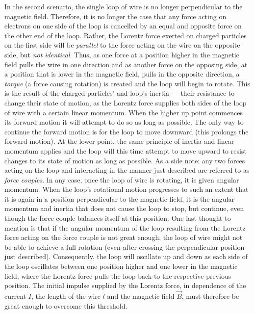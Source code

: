 
In the second scenario, the single loop of wire is no longer perpendicular to the magnetic field. Therefore, it is no longer the case that any force acting on electrons on one side of the loop is cancelled by an equal and opposite force on the other end of the loop. Rather, the Lorentz force exerted on charged particles on the first side will be \emph{parallel} to the force acting on the wire on the opposite side, but \emph{not identical}. Thus, as one force at a position higher in the magnetic field pulls the wire in one direction and as another force on the opposing side, at a position that is lower in the magnetic field, pulls in the opposite direction, a \emph{torque} (a force causing rotation) is created and the loop will begin to rotate. This is the result of the charged particles' and loop's inertia --- their resistance to change their state of motion, as the Lorentz force supplies both sides of the loop of wire with a certain linear momentum. When the higher up point commences its forward motion it will attempt to do so as long as possible. The only way to continue the forward motion is for the loop to move downward (this prolongs the forward motion). At the lower point, the same principle of inertia and linear momentum applies and the loop will this time attempt to move upward to resist changes to its state of motion as long as possible. As a side note: any two forces acting on the loop and interacting in the manner just described are referred to as \emph{force couples}. In any case, once the loop of wire is rotating, it is given angular momentum. When the loop's rotational motion progresses to such an extent that it is again in a position perpendicular to the magnetic field, it is the angular momentum and inertia that does not cause the loop to stop, but continue, even though the force couple balances itself at this position. One last thought to mention is that if the angular momentum of the loop resulting from the Lorentz force acting on the force couple is not great enough, the loop of wire might not be able to achieve a full rotation (even after crossing the perpendicular position just described). Consequently, the loop will oscillate up and down as each side of the loop oscillates between one position higher and one lower in the magnetic field, where the Lorentz force pulls the loop back to the respective previous position. The initial impulse supplied by the Lorentz force, in dependence of the current $I$, the length of the wire $l$ and the magnetic field $\vec{B}$, must therefore be great enough to overcome this threshold.

